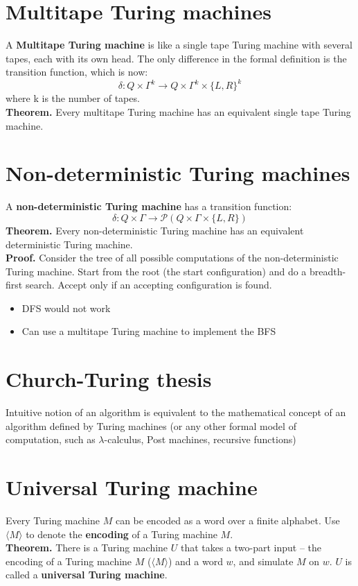 \documentclass{article}
\begin{document}
\section{Multitape Turing machines}
A \textbf{Multitape Turing machine} is like a single tape Turing machine with several tapes, each with its own head. The only difference in the formal definition is the transition function, which is now:
$$\delta: Q \times \Gamma^k \rightarrow Q \times \Gamma^k \times \{L, R\}^k$$
where k is the number of tapes.\medskip
\\\textbf{Theorem.} Every multitape Turing machine has an equivalent single tape Turing machine.

\section{Non-deterministic Turing machines}
A \textbf{non-deterministic Turing machine} has a transition function:
$$\delta: Q \times \Gamma \rightarrow \mathcal{P}(Q \times \Gamma \times \{L, R\})$$
\textbf{Theorem.} Every non-deterministic Turing machine has an equivalent deterministic Turing machine.
\\\textbf{Proof.} Consider the tree of all possible computations of the non-deterministic Turing machine. Start from the root (the start configuration) and do a breadth-first search. Accept only if an accepting configuration is found.
\begin{itemize}
	\item{DFS would not work}
	\item{Can use a multitape Turing machine to implement the BFS}
\end{itemize}

\section{Church-Turing thesis}
Intuitive notion of an algorithm is equivalent to the mathematical concept of an algorithm defined by Turing machines (or any other formal model of computation, such as $\lambda$-calculus, Post machines, recursive functions)

\section{Universal Turing machine}
Every Turing machine $M$ can be encoded as a word over a finite alphabet. Use $\langle M\rangle$ to denote the \textbf{encoding} of a Turing machine $M$.\medskip
\\\textbf{Theorem.} There is a Turing machine $U$ that takes a two-part input -- the encoding of a Turing machine $M$ ($\langle M \rangle$) and a word $w$, and simulate $M$ on $w$. $U$ is called a \textbf{universal Turing machine}.
\end{document}
